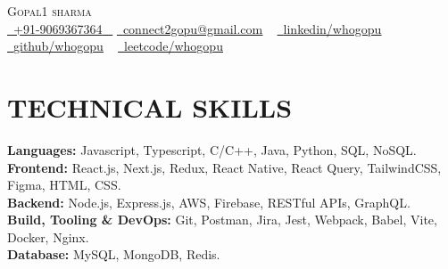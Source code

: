 \documentclass[letterpaper,11pt]{article}
\begin{document}


\begin{center}
    {\Huge \scshape Gopal1 sharma} \\ 
    \small \href{tel:+919069367364}{ \raisebox{-0.1\height}\faPhone\ \underline{+91-9069367364} ~} \href{mailto:connect2gopu@gmail.com}{\raisebox{-0.2\height}\faEnvelope\  \underline{connect2gopu@gmail.com}} ~ 
    \href{https://linkedin.com/in/whogopu}{\raisebox{-0.2\height}\faLinkedinSquare\ \underline{linkedin/whogopu}}  ~
    \href{https://github.com/whogopu}{\raisebox{-0.2\height}\faGithub\ \underline{github/whogopu}} ~
    \href{https://leetcode.com/u/whogopu/}{\raisebox{-0.2\height}\faCode\ \underline{leetcode/whogopu}} ~
\end{center}

\section{TECHNICAL SKILLS}
 \begin{itemize}[leftmargin=0.15in, label={}]
    \small{\item{
     \textbf{\normalsize{Languages:}}{ \normalsize{Javascript, Typescript,  C/C++,  Java, Python,  SQL, NoSQL.}} \\
     \textbf{\normalsize{Frontend:}}{ \normalsize{React.js, Next.js,  Redux,  React Native, React Query,  TailwindCSS, Figma, HTML, CSS.}} \\
    \textbf{\normalsize{Backend:}}{ \normalsize{Node.js, Express.js, AWS, Firebase, RESTful APIs, GraphQL.}} \\
    \textbf{\normalsize{Build, Tooling \& DevOps:}}{ \normalsize{Git, Postman, Jira, Jest, Webpack, Babel, Vite, Docker, Nginx.}} \\
    
     \textbf{\normalsize{Database:}}{\normalsize{ MySQL, MongoDB, Redis.}} \\

    }}
 \end{itemize}
 \vspace{-15pt}
\end{document}
